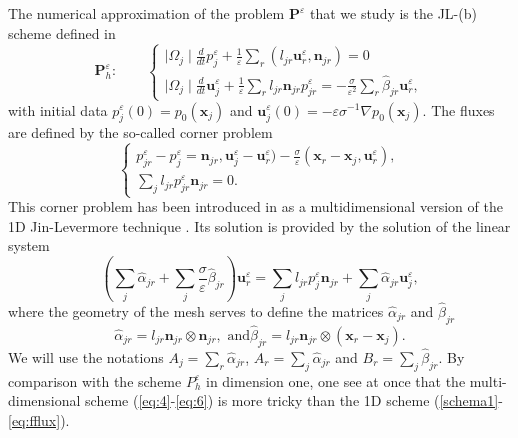 \documentclass[a4paper,french,english,10pt]{article}
\newcommand\ljr{l_{jr}}
\newcommand\njr{\mathbf{n}_{jr}}
\newcommand\uu{\mathbf{u}}
\newcommand\eps{\varepsilon}
\newcommand\alj{\widehat{\alpha}_{jr}}
\newcommand\bej{\widehat{\beta}_{jr}}
\newcommand\xj{\mathbf{x}_j}
\newcommand\xr{\mathbf{x}_r}
\newcommand\uj{\uu_j}
\newcommand\ur{\uu_r}
\begin{document}
The numerical approximation  
 of the problem  $\mathbf P^\eps$ that we study 
 is the JL-(b) scheme defined
in   \cite{glaceap}
\begin{equation}\label{eq:4}
\mathbf P_h^\eps:
\qquad \left\{ 
\begin{array}{l}
\displaystyle \mid\Omega_{j}\mid\frac{d}{dt} p_{j}^{\eps}+\frac{1}{\varepsilon}
\sum_{r}(l_{jr}\ur^{\eps},\njr)=0\\
\displaystyle \mid
\Omega_{j}\mid\frac{d}{dt}\uj^{\eps}+\frac{1}{\varepsilon}
\sum_{r} l_{jr} \njr    p_{jr}^{\eps}=-\frac{\sigma}{\varepsilon^{2}}\sum_{r}\widehat{
\beta}_{jr}\ur^{\eps},
\end{array}
\right.
\end{equation}
with initial data $p_j^{\eps}(0)=p_0(\mathbf{x}_j)$ and $\mathbf{u}_j^{\eps}(0) = -\eps\sigma^{-1}\nabla p_0(\mathbf{x}_j)$.
The fluxes are defined by the so-called 
corner problem 
\begin{equation}\label{eq:5}
\left\{ \begin{array}{l}
\displaystyle 
p_{jr}^{\eps}-p_j^\eps=
\njr,    \uj^{\eps}-\ur^{\eps}
)-\frac{\sigma}{\varepsilon}( \xr -\xj, \ur^{\eps}), 
\\
\sum_{j}\ljr
p_{jr}^{\eps}\njr=0.
 \end{array}\right.
\end{equation}
This corner problem has been introduced in 
\cite{glaceap} as a multidimensional version
of the 1D Jin-Levermore technique   \cite{jinlev}.
Its solution is provided by the solution
of the  linear system
\begin{equation*} \label{eq:5bis}
\displaystyle \left( \sum_{j}\alj+ 
\sum_{j}\frac{\sigma}{\varepsilon}\bej\right)\ur^{
\eps}= \sum_{j}\ljr
p_j^{\eps}\njr+\sum_j\alj\uj^{\eps},
\end{equation*}
 where the geometry of the mesh serves to define the  
  matrices  
$\alj$ and $\bej$ 
\begin{equation}\label{eq:6}
\alj=\ljr\njr\otimes\njr,\mbox{ and
}\bej=\ljr\njr\otimes(\xr-\xj) .
\end{equation}
We will use the notations
$A_j=\sum_r\alj$, $A_r=\sum_j\alj$ and
$B_r=\sum_j\bej$. 
By comparison with the scheme $P_h^\eps$ in dimension one, one see at once
that the multi-dimensional scheme (\ref{eq:4}-\ref{eq:6})  is  more 
tricky than the 1D scheme (\ref{schema1}-\ref{eq:fflux}).
\end{document}

